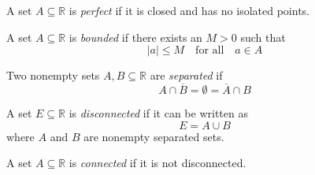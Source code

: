 \par\vspace{1 cm}
\begin{definition*} A set $A\subseteq\mathbb{R}$ is \textit{perfect} if it is closed and has no isolated points.
\end{definition*}
\par\vspace{1 cm}
\begin{definition*} A set $A\subseteq\mathbb{R}$ is \textit{bounded} if there exists an $M>0$ such that
\[
|a| \leq M\quad\mbox{for all}\quad a\in A
\]
\end{definition*}
\par\vspace{1 cm}
\begin{definition*} Two nonempty sets $A,B\subseteq\mathbb{R}$ are \textit{separated} if
\[
A\cap\overline{B} = \emptyset = \overline{A}\cap B
\]
\end{definition*}
\par\vspace{1 cm}
\begin{definition*} A set $E\subseteq\mathbb{R}$ is \textit{disconnected} if it can be written as 
\[
E=A\cup B
\]
where $A$ and $B$ are nonempty separated sets.
\end{definition*}
\par\vspace{1 cm}
\begin{definition*} A set $A\subseteq\mathbb{R}$ is \textit{connected} if it is not disconnected.
\end{definition*}

